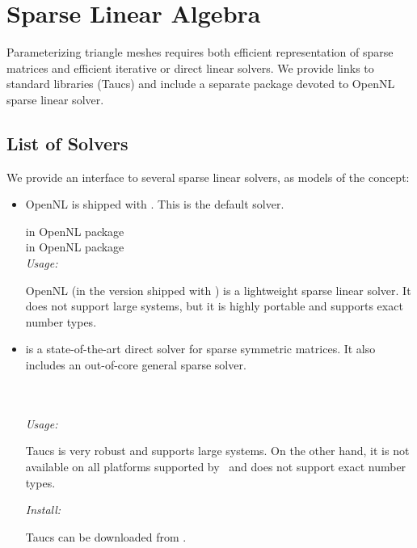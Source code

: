 \section{Sparse Linear Algebra \label{sec:Sparse-Linear-Algebra}}

Parameterizing triangle meshes requires both efficient representation
of sparse matrices and efficient iterative or direct linear
solvers. We provide links to standard libraries ({\sc Taucs})
and include a separate package devoted to OpenNL sparse linear solver.

\subsection{List of Solvers}

We provide an interface to several sparse linear solvers, as models
of the  concept:

\begin{itemize}

\item
    OpenNL \cite{cgal:l-nmdgp-05} is shipped with \cgal. This is the default solver.

     in OpenNL package  \\
     in OpenNL package  \\

    \emph{Usage:}

    OpenNL (in the version shipped with \cgal) is a lightweight sparse linear solver.
    It does not support large systems, but it is highly portable and
    supports exact number types.

\item
    is a state-of-the-art direct solver for sparse symmetric matrices.
    It also includes an out-of-core general sparse solver.

      \\
      \\

    \emph{Usage:}

    {\sc Taucs} is very robust and supports large systems.
    On the other hand, it is not available on all platforms
    supported by \cgal\ and does not support exact number types.

    \emph{Install:}

    {\sc Taucs} can be downloaded from
    {}.

\end{itemize}


